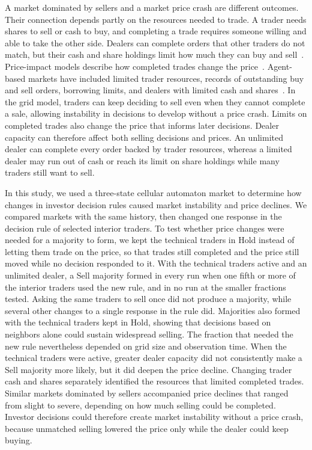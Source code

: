 A market dominated by sellers and a market price crash are different
outcomes. Their connection depends partly on the resources needed to trade. A trader needs shares to sell or cash to
buy, and completing a trade requires someone willing and able to take the
other side. Dealers can complete orders that other traders do not match, but
their cash and share holdings limit how much they can buy and
sell~\cite{garman1976market,stoll1978supply,ho1981optimal,madhavan2000market,adrian2017dealer}.
Price-impact models describe how completed trades change the
price~\cite{kyle1985continuous,hasbrouck1991measuring,farmer2005predictive,bouchaud2009how}.
Agent-based markets have included limited trader resources, records of
outstanding buy and sell orders, borrowing limits, and dealers with limited
cash and
shares~\cite{raberto2001agent,chiarella2002simulation,thurner2012leverage,braunmunzinger2018agent}.
In the grid model, traders can keep deciding to sell even when they cannot
complete a sale, allowing instability in decisions to develop without a
price crash. Limits on completed trades also change the price that informs later decisions. Dealer capacity can therefore affect both selling decisions and prices. An unlimited dealer can complete every order
backed by trader resources, whereas a limited dealer may run out of cash or
reach its limit on share holdings while many traders still want to sell.

In this study, we used a three-state cellular automaton market to determine how changes in investor decision rules caused market instability and price declines. We compared markets with
the same history, then changed one response in the decision rule of selected
interior traders. To test whether price changes were needed for a majority
to form, we kept the technical traders in Hold instead of letting them
trade on the price, so that trades still completed and the price still moved
while no decision responded to it. With the technical traders active and an
unlimited dealer, a Sell majority formed in every run when one fifth or more
of the interior traders used the new rule, and in no run at the smaller
fractions tested. Asking the same traders to sell once did not produce a
majority, while several other changes to a single response in the rule did.
Majorities also formed with the technical traders kept in Hold, showing
that decisions based on neighbors alone could sustain widespread selling.
The fraction that needed the new rule nevertheless depended on grid size and
observation time. When the technical traders were active, greater dealer
capacity did not consistently make a Sell majority more likely, but it did
deepen the price decline. Changing trader cash and shares separately
identified the resources that limited completed trades. Similar markets
dominated by sellers accompanied price declines that ranged from slight to
severe, depending on how much selling could be completed. Investor
decisions could therefore create market instability without a price crash,
because unmatched selling lowered the price only while the dealer could keep
buying.
